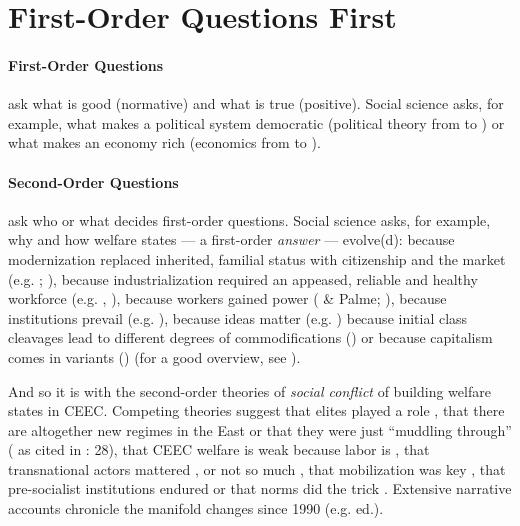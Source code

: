 \documentclass[11pt,a4paper,oneside,openright]{article}
\begin{document}
\newpage

\section{First-Order Questions First}%

\paragraph{First-Order Questions} ask what is good (normative) and what is true (positive). Social science asks, for example, what makes a political system democratic (political theory from \citeauthor{Aristoteles} to \citeauthor{Dahl-1989-aa}) or what makes an economy rich (economics from \citeauthor{Smith-1776-lq} to \citeauthor{Hicks1939}).

\paragraph{Second-Order Questions} ask who or what decides first-order questions. Social science asks, for example, why and how welfare states --- a first-order \emph{answer} --- evolve(d): because modernization replaced inherited, familial status with citizenship and the market (e.g. \citeauthor{Titmuss1974}; \citeauthor{Marshall-1950-aa}), because industrialization required an appeased, reliable and healthy workforce (e.g. \citeauthor{Flora1981}, \citeauthor{Wilensky1975}), because workers gained power (\citeauthor{Korpi1983} \& Palme; \citeauthor{Jessop2002}), because institutions prevail (e.g. \citeauthor{Rothstein}), because ideas matter (e.g. \citeauthor{Stiller2009}) because initial class cleavages lead to different degrees of commodifications (\citeauthor{Esping-Andersen-1990-aa}) or because capitalism comes in variants (\citeauthor{HallSoskice-2001-aa}) (for a good overview, see \citealt{Beland2008}).

And so it is with the second-order theories of \emph{social conflict} of building welfare states in \gls{CEEC}. Competing theories suggest that elites played a role \citep{Aidukaite2006}, that there are altogether new regimes in the East \citep{Cerami2006} or that they were just ``muddling through'' (\citealt{Kovasc} as cited in \citealt{Fuchs2008}: 28), that \gls{CEEC} welfare is weak because labor is \citep{Crowley2002}, that transnational actors mattered \citep{Orenstein2009}, or not so much \citep{Sissenich2005}, that mobilization was key \citep{Vanhuysse2006a}, that pre-socialist institutions endured \citep{Inglot2008} or that norms did the trick \citep{Schimmelfennig2001}. Extensive narrative accounts chronicle the manifold changes since 1990 (e.g. \citealt{Deacon1992} ed.). 
\end{document}
